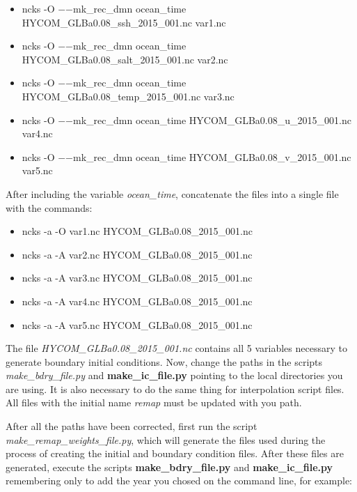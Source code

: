 \begin{itemize}
    \item ncks -O  $-$$-$mk\_rec\_dmn ocean\_time HYCOM\_GLBa0.08\_ssh\_2015\_001.nc  var1.nc
    \item ncks -O $-$$-$mk\_rec\_dmn ocean\_time HYCOM\_GLBa0.08\_salt\_2015\_001.nc  var2.nc
    \item ncks -O $-$$-$mk\_rec\_dmn ocean\_time HYCOM\_GLBa0.08\_temp\_2015\_001.nc  var3.nc    
    \item ncks -O $-$$-$mk\_rec\_dmn ocean\_time HYCOM\_GLBa0.08\_u\_2015\_001.nc  var4.nc
    \item ncks -O $-$$-$mk\_rec\_dmn ocean\_time HYCOM\_GLBa0.08\_v\_2015\_001.nc  var5.nc  
\end{itemize}
\bigskip

\noindent After including the variable \textit{ocean\_time}, concatenate the files into a single file with the commands: 
\bigskip

\begin{itemize}
    \item ncks  -a  -O var1.nc  HYCOM\_GLBa0.08\_2015\_001.nc
    \item ncks  -a  -A var2.nc  HYCOM\_GLBa0.08\_2015\_001.nc
    \item ncks  -a  -A var3.nc  HYCOM\_GLBa0.08\_2015\_001.nc
    \item ncks  -a  -A var4.nc  HYCOM\_GLBa0.08\_2015\_001.nc
    \item ncks  -a  -A var5.nc  HYCOM\_GLBa0.08\_2015\_001.nc
\end{itemize}
\bigskip

The file \textit{HYCOM\_GLBa0.08\_2015\_001.nc} contains all 5 variables necessary to generate boundary initial conditions.
Now, change the paths in the scripts \textit{make\_bdry\_file.py} and \textbf{make\_ic\_file.py} pointing to the local directories you are using. 
It is also necessary to do the same thing for interpolation script files. All files with the initial name \textit{remap} must be updated with you path.
\bigskip

\noindent After all the paths have been corrected, first run the script \textit{make\_remap\_weights\_file.py}, which will generate the files 
used during the process of creating the initial and boundary condition files. After these files are generated, execute the scripts \textbf{make\_bdry\_file.py} and
\textbf{make\_ic\_file.py} remembering only to add the year you chosed on the command line, for example: 
\bigskip

